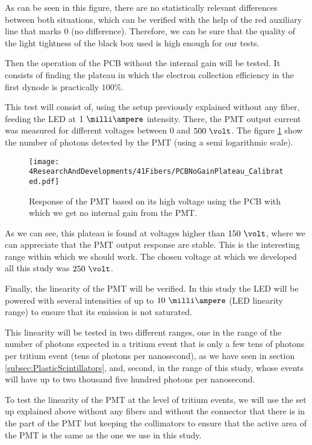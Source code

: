 As can be seen in this figure, there are no statistically relevant differences between both situations, which can be verified with the help of the red auxiliary line that marks 0 (no difference). Therefore, we can be sure that the quality of the light tightness of the black box used is high enough for our tests.

Then the operation of the PCB without the internal gain will be tested. It consists of finding the plateau in which the electron collection efficiency in the first dynode is practically $100\%$. 

This test will consist of, using the setup previously explained without any fiber, feeding the LED at $1~\milli\ampere$ intensity. There, the PMT output current was measured for different voltages between $0$ and $500~\volt$. The figure \ref{fig:PlateauNoGainPMT} show the number of photons detected by the PMT (using a semi logarithmic scale).

\begin{figure}[h]
\centering
\texttt{[image: 4ResearchAndDevelopments/41Fibers/PCBNoGainPlateau\_Calibrated.pdf]}
\caption{Response of the PMT based on its high voltage using the PCB with which we get no internal gain from the PMT.\label{fig:PlateauNoGainPMT}}
\end{figure}

As we can see, this plateau is found at voltages higher than $150~\volt$, where we can appreciate that the PMT output response are stable. This is the interesting range within which we should work. The chosen voltage at which we developed all this study was $250~\volt$.

Finally, the linearity of the PMT will be verified. In this study the LED will be powered with several intensities of up to $10~\milli\ampere$ (LED linearity range) to ensure that its emission is not saturated.

This linearity will be tested in two different ranges, one in the range of the number of photons expected in a tritium event that is only a few tens of photons per tritium event (tens of photons per nanosecond),  as we have seen in section \ref{subsec:PlasticScintillators}, and, second, in the range of this study, whose events will have up to two thousand five hundred photons per nanosecond.

To test the linearity of the PMT at the level of tritium events, we will use the set up explained above without any fibers and without the connector that there is in the part of the PMT but keeping the collimators to ensure that the active area of the PMT is the same as the one we use in this study. 

